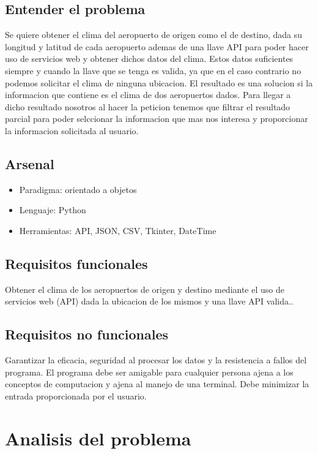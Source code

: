 \documentclass[12pt]{article}
\begin{document}
\subsection{Entender el problema}
Se quiere obtener el clima del aeropuerto de origen como el de destino, dada su longitud y latitud de cada aeropuerto ademas de una llave API para poder hacer uso de servicios web y obtener dichos datos del clima. Estos datos suficientes siempre y cuando la llave que se tenga es valida, ya que en el caso contrario no podemos solicitar el clima de ninguna ubicacion. El resultado es una solucion si la informacion que contiene es el clima de dos aeropuertos dados. Para llegar a dicho resultado nosotros al hacer la peticion tenemos que filtrar el resultado parcial para poder selccionar la informacion que mas nos interesa y proporcionar la informacion solicitada al usuario.
\subsection{Arsenal}
\begin{itemize}
\item Paradigma: orientado a objetos
\item Lenguaje: Python
\item Herramientas: API, JSON, CSV, Tkinter, DateTime
\end{itemize}

\subsection{Requisitos funcionales}
Obtener el clima de los aeropuertos de origen y destino mediante el uso de servicios web (API) dada la ubicacion de los mismos y una llave API valida..
\subsection{Requisitos no funcionales}
Garantizar la eficacia, seguridad al procesar los datos y la resistencia a fallos del programa. El programa debe ser amigable para cualquier persona ajena a los conceptos de computacion y ajena al manejo de una terminal. Debe minimizar la entrada proporcionada por el usuario.
\section{Analisis del problema}
\end{document}
